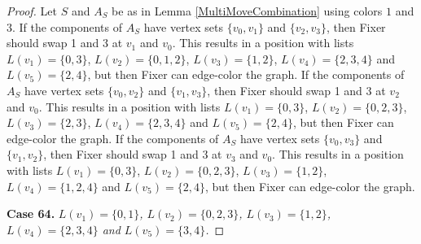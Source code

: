 \documentclass[12pt]{amsart}
\theoremstyle{plain}
\theoremstyle{definition}
\theoremstyle{remark}
\begin{document}
\begin{proof}
Let $S$ and $A_S$ be as in Lemma \ref{MultiMoveCombination} using colors $1$ and $3$. If the components of $A_S$ have vertex sets $\{v_0, v_1\}$ and $\{v_2, v_3\}$, then Fixer should swap 1 and 3 at $v_1$ and $v_0$. This results in a position with lists $L(v_1) = \{0, 3\}$, $L(v_2) = \{0, 1, 2\}$, $L(v_3) = \{1, 2\}$, $L(v_4) = \{2, 3, 4\}$ and $L(v_5) = \{2, 4\}$, but then Fixer can edge-color the graph.
If the components of $A_S$ have vertex sets $\{v_0, v_2\}$ and $\{v_1, v_3\}$, then Fixer should swap 1 and 3 at $v_2$ and $v_0$. This results in a position with lists $L(v_1) = \{0, 3\}$, $L(v_2) = \{0, 2, 3\}$, $L(v_3) = \{2, 3\}$, $L(v_4) = \{2, 3, 4\}$ and $L(v_5) = \{2, 4\}$, but then Fixer can edge-color the graph.
If the components of $A_S$ have vertex sets $\{v_0, v_3\}$ and $\{v_1, v_2\}$, then Fixer should swap 1 and 3 at $v_3$ and $v_0$. This results in a position with lists $L(v_1) = \{0, 3\}$, $L(v_2) = \{0, 2, 3\}$, $L(v_3) = \{1, 2\}$, $L(v_4) = \{1, 2, 4\}$ and $L(v_5) = \{2, 4\}$, but then Fixer can edge-color the graph.

\noindent\textbf{Case 64.  }\textit{$L(v_1) = \{0, 1\}$, $L(v_2) = \{0, 2, 3\}$, $L(v_3) = \{1, 2\}$, $L(v_4) = \{2, 3, 4\}$ and $L(v_5) = \{3, 4\}$.}


\end{proof}
\end{document}
